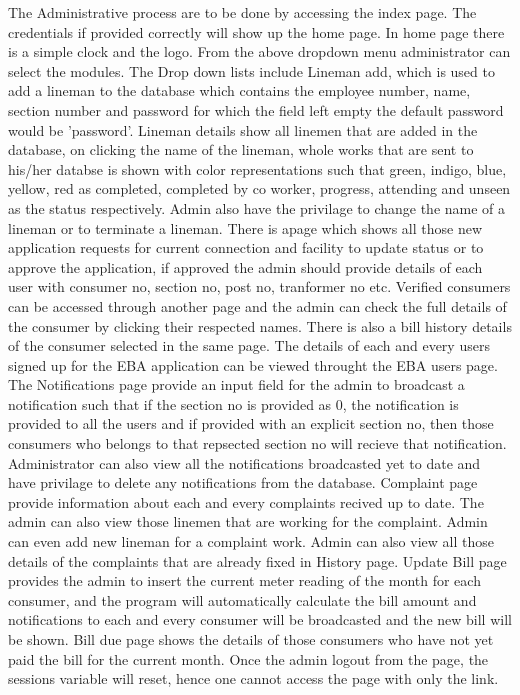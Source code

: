 \documentclass[12pt,a4paper,oneside]{report}
\begin{document}
 \par The Administrative process are to be done by accessing the index page. The credentials if provided correctly will show up the home page. In home page there is a simple clock and the logo. From the above dropdown menu administrator can select the modules. The Drop down lists include Lineman add, which is used to add a lineman to the database which contains the employee number, name, section number and password for which the field left empty the default password would be 'password'. Lineman details show all linemen that are added in the database, on clicking the name of the lineman, whole works that are sent to his/her databse is shown with color representations such that green, indigo, blue, yellow, red as completed, completed by co worker, progress, attending and unseen as the status respectively. Admin also have the privilage to change the name of a lineman or to terminate a lineman. There is apage which shows all those new application requests for current connection and facility to update status or to approve the application, if approved the admin should provide details of each user with consumer no, section no, post no, tranformer no etc. Verified consumers can be accessed through another page and the admin can check the full details of the consumer by clicking their respected names. There is also a bill history details of the consumer selected in the same page. The details of each and every users signed up for the EBA application can be viewed throught the EBA users page. The Notifications page provide an input field for the admin to broadcast a notification such that if the section no is provided as 0, the notification is provided to all the users and if provided with an explicit section no, then those consumers who belongs to that repsected section no will recieve that notification. Administrator can also view all the notifications broadcasted yet to date and have privilage to delete any notifications from the database. Complaint page provide information about each and every complaints recived up to date. The admin can also view those linemen that are working for the complaint. Admin can even add new lineman for a complaint work. Admin can also view all those details of the complaints that are already fixed in History page. Update Bill page provides the admin to insert the current meter reading of the month for each consumer, and the program will automatically calculate the bill amount and notifications to each and every consumer will be broadcasted and the new bill will be shown. Bill due page shows the details of those consumers who have not yet paid the bill for the current month. Once the admin logout from the page, the sessions variable will reset, hence one cannot access the page with only the link.
 
\end{document}
